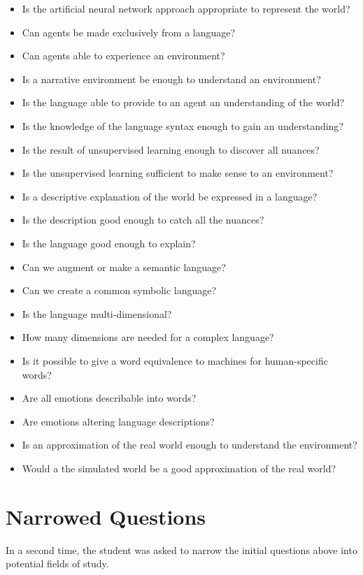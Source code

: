 \begin{itemize}[noitemsep]
    \item Is the artificial neural network approach appropriate to represent the world?
    \item Can agents be made exclusively from a language?
    \item Can agents able to experience an environment?
    \item Is a narrative environment be enough to understand an environment?
    \item Is the language able to provide to an agent an understanding of the world?
    \item Is the knowledge of the language syntax enough to gain an understanding?
    \item Is the result of unsupervised learning enough to discover all nuances?
    \item Is the unsupervised learning sufficient to make sense to an environment?
    \item Is a descriptive explanation of the world be expressed in a language?
    \item Is the description good enough to catch all the nuances?
    \item Is the language good enough to explain?
    \item Can we augment or make a semantic language?
    \item Can we create a common symbolic language?
    \item Is the language multi-dimensional?
    \item How many dimensions are needed for a complex language?
    \item Is it possible to give a word equivalence to machines for human-specific words?
    \item Are all emotions describable into words?
    \item Are emotions altering language descriptions?
    \item Is an approximation of the real world enough to understand the environment?
    \item Would a the simulated world be a good approximation of the real world?
\end{itemize}

\section{Narrowed Questions}
In a second time, the student was asked to narrow the initial questions above into potential fields of study.

